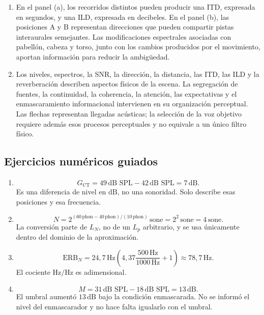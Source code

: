 \begin{enumerate}[label=\textbf{I\arabic*.},leftmargin=*]
    \item En el panel (a), los recorridos distintos pueden producir una ITD,
    expresada en segundos, y una ILD, expresada en decibeles. En el panel (b),
    las posiciones A y B representan direcciones que pueden compartir pistas
    interaurales semejantes. Las modificaciones espectrales asociadas con
    pabellón, cabeza y torso, junto con los cambios producidos por el
    movimiento, aportan información para reducir la ambigüedad.

    \item Los niveles, espectros, la SNR, la dirección, la distancia, las ITD,
    las ILD y la reverberación describen aspectos físicos de la escena. La
    segregación de fuentes, la continuidad, la coherencia, la atención, las
    expectativas y el enmascaramiento informacional intervienen en su
    organización perceptual. Las flechas representan llegadas acústicas; la
    selección de la voz objetivo requiere además esos procesos perceptuales y
    no equivale a un único filtro físico.
\end{enumerate}

\subsection*{Ejercicios numéricos guiados}

\begin{enumerate}[label=\textbf{G\arabic*.},leftmargin=*]
    \item
    \[
        G_{\mathrm{CT}}
          =49\,\text{dB SPL}-42\,\text{dB SPL}
          =7\,\text{dB}.
    \]
    Es una diferencia de nivel en \(\text{dB}\), no una sonoridad. Solo
    describe esas posiciones y esa frecuencia.

    \item
    \[
        N
          =2^{(60\,\text{phon}-40\,\text{phon})/
               (10\,\text{phon})}\,\text{sone}
          =2^2\,\text{sone}
          =4\,\text{sone}.
    \]
    La conversión parte de \(L_N\), no de un \(L_p\) arbitrario, y se usa
    únicamente dentro del dominio de la aproximación.

    \item
    \[
        \mathrm{ERB}_{N}
          =24{,}7\,\text{Hz}
           \left(4{,}37\frac{500\,\text{Hz}}
                              {1000\,\text{Hz}}+1\right)
          \approx78{,}7\,\text{Hz}.
    \]
    El cociente \(\text{Hz}/\text{Hz}\) es adimensional.

    \item
    \[
        M=31\,\text{dB SPL}-18\,\text{dB SPL}=13\,\text{dB}.
    \]
    El umbral aumentó \(13\,\text{dB}\) bajo la condición enmascarada. No se
    informó el nivel del enmascarador y no hace falta igualarlo con el umbral.
\end{enumerate}

